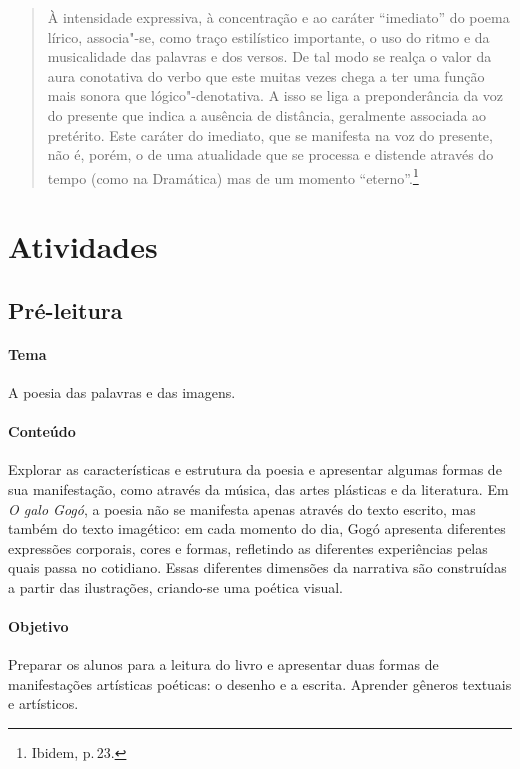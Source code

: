\documentclass[11pt]{extarticle}
\begin{document}
\begin{quote}
À intensidade expressiva, à concentração e ao caráter ``imediato'' do poema lírico, associa"-se, como traço estilístico importante, o uso do ritmo e da musicalidade das palavras e dos versos. De tal modo se realça o valor da aura conotativa do verbo que este muitas vezes chega a ter uma função mais sonora que lógico"-denotativa. A isso se liga a preponderância da voz do presente que indica a ausência de distância, geralmente associada ao pretérito. Este caráter do imediato, que se manifesta na voz do presente, não é, porém, o de uma atualidade que se processa e distende através do tempo (como na Dramática) mas de um momento ``eterno''.\footnote{Ibidem, p.\,23.}
\end{quote}



\section{Atividades}

\subsection{Pré-leitura}

\paragraph{Tema} A poesia das palavras e das imagens.

\paragraph{Conteúdo} Explorar as características e estrutura da poesia e apresentar algumas formas de sua manifestação, como através da música, das artes plásticas e da literatura. Em \textit{O galo Gogó}, a poesia não se manifesta apenas através do texto escrito, mas também do texto imagético: em cada momento do dia, Gogó apresenta diferentes expressões corporais, cores e formas, refletindo as diferentes experiências pelas quais passa no cotidiano. Essas diferentes dimensões da narrativa são construídas a partir das ilustrações, criando-se uma poética visual.


\paragraph{Objetivo} Preparar os alunos para a leitura do livro e apresentar duas formas de manifestações artísticas poéticas: o desenho e a escrita. Aprender gêneros textuais e artísticos.
\end{document}
